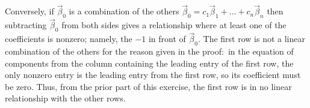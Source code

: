 \begin{exercises}
\begin{answer}
\begin{exparts}
             Conversely, if $\vec{\beta}_0$ is a combination of the others 
             $\vec{\beta}_0=c_1\vec{\beta}_1+\dots+c_n\vec{\beta}_n$
             then subtracting
             $\vec{\beta}_0$ from both sides gives a relationship where 
             at least one
             of the coefficients is nonzero; namely,
             the $-1$ in front of $\vec{\beta}_0$.
           \partsitem The first row is not a linear combination of the
             others for
             the reason given in the proof:~in the equation of components from
             the column containing the leading entry of the first row, the
             only nonzero entry is the leading entry from the first row, so
             its coefficient must be zero.
             Thus, from the prior part of this exercise, the first row is in
             no linear relationship with the other rows.


\end{exparts}
\end{answer}
\end{exercises}

